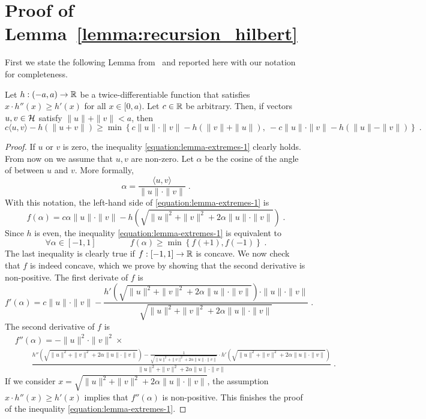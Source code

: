 \section{Proof of Lemma~\ref{lemma:recursion_hilbert}}
\label{section:hilbert-space-reduction}

First we state the following Lemma from~\cite{McMahanO14} and reported here with our notation for completeness.
\begin{lemma}[Extremes]
\label{lemma:extremes}
Let $h:(-a,a) \to \mathbb{R}$ be a twice-differentiable function that
satisfies $x \cdot h''(x) \ge h'(x)$ for all $x \in [0,a)$. Let $c \in \mathbb{R}$
be arbitrary. Then, if vectors $u,v \in \mathcal{H}$ satisfy $\|u\| + \|v\| < a$, then
\begin{equation}
\label{equation:lemma-extremes-1}
c \langle u, v \rangle - h(\|u + v\|) \ge \min \left\{ c \|u\| \cdot \|v\| - h(\|v\| + \|u\|), \ - c \|u\| \cdot \|v\| - h(\|u\| - \|v\|) \right\} \; .
\end{equation}
\end{lemma}
%
\begin{proof}
If $u$ or $v$ is zero, the inequality \eqref{equation:lemma-extremes-1} clearly
holds. From now on we assume that $u,v$ are non-zero. Let $\alpha$ be the cosine
of the angle of between $u$ and $v$. More formally,
$$
\alpha = \frac{\langle u, v \rangle}{\|u\| \cdot \|v\|} \; .
$$
With this notation, the left-hand side of \eqref{equation:lemma-extremes-1} is
$$
f(\alpha) = c \alpha \|u\| \cdot \|v\| - h(\sqrt{\|u\|^2 + \|v\|^2 + 2 \alpha \|u\| \cdot \|v\|}) \; .
$$
Since $h$ is even, the inequality \eqref{equation:lemma-extremes-1} is equivalent to
$$
\forall \alpha \in [-1,1] \qquad \qquad f(\alpha) \ge \min \left\{f(+1), f(-1)\right\} \; .
$$
The last inequality is clearly true if $f:[-1,1] \to \mathbb{R}$ is concave. We now
check that $f$ is indeed concave, which we prove by showing that the second
derivative is non-positive. The first derivate of $f$ is
$$
f'(\alpha) = c \|u\| \cdot \|v\| - \frac{h'(\sqrt{\|u\|^2 + \|v\|^2 + 2 \alpha \|u\| \cdot \|v\|}) \cdot \|u\| \cdot \|v\|}{\sqrt{\|u\|^2 + \|v\|^2 + 2 \alpha \|u\| \cdot \|v\|}} \; .
$$
The second derivative of $f$ is
\begin{align*}
&f''(\alpha) = - \|u\|^2 \cdot \|v\|^2 \times \\
&\qquad \frac{h''(\sqrt{\|u\|^2 + \|v\|^2 + 2 \alpha \|u\| \cdot \|v\|})  - \frac{1}{\sqrt{\|u\|^2 + \|v\|^2 + 2\alpha \|u\| \cdot \|v\|}} \cdot h'(\sqrt{\|u\|^2 + \|v\|^2 + 2 \alpha \|u\| \cdot \|v\|})  }{\|u\|^2 + \|v\|^2 + 2 \alpha \|u\| \cdot \|v\|} \; .
\end{align*}
If we consider $x = \sqrt{\|u\|^2 + \|v\|^2 + 2 \alpha \|u\| \cdot \|v\|}$, the
assumption $x \cdot h''(x) \ge h'(x)$ implies that $f''(\alpha)$ is non-positive.
This finishes the proof of the inequality \eqref{equation:lemma-extremes-1}.
\end{proof}

